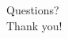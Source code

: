\documentclass{beamer}
\begin{document}

\begin{frame}
    \begin{center}
        \large
Questions? \\
\bigskip
Thank you!
    \end{center}
\end{frame}
\end{document}
